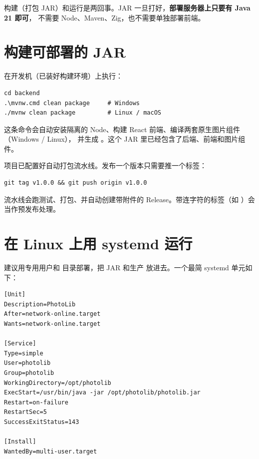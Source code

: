\documentclass[cn,11pt,green]{elegantbook}
\begin{document}
\begin{notebox}[部署机不需要构建工具]
  构建（打包 JAR）和运行是两回事。JAR 一旦打好，\textbf{部署服务器上只要有 Java 21 即可}，
  不需要 Node、Maven、Zig，也不需要单独部署前端。
\end{notebox}

\section{构建可部署的 JAR}

在开发机（已装好构建环境）上执行：

\begin{stepbox}
\begin{verbatim}
cd backend
.\mvnw.cmd clean package     # Windows
./mvnw clean package         # Linux / macOS
\end{verbatim}
\end{stepbox}

这条命令会自动安装隔离的 Node、构建 React 前端、编译两套原生图片组件（Windows / Linux），
并生成 。这个 JAR 里已经包含了后端、前端和图片组件。

\begin{tipbox}
  项目已配置好自动打包流水线。发布一个版本只需要推一个标签：

  \begin{verbatim}git tag v1.0.0 && git push origin v1.0.0\end{verbatim}

  流水线会跑测试、打包、并自动创建带附件的 Release。带连字符的标签（如 ）会当作预发布处理。
\end{tipbox}

\section{在 Linux 上用 systemd 运行}

建议用专用用户和  目录部署，把 JAR 和生产  放进去。一个最简 systemd 单元如下：

\begin{verbatim}
[Unit]
Description=PhotoLib
After=network-online.target
Wants=network-online.target

[Service]
Type=simple
User=photolib
Group=photolib
WorkingDirectory=/opt/photolib
ExecStart=/usr/bin/java -jar /opt/photolib/photolib.jar
Restart=on-failure
RestartSec=5
SuccessExitStatus=143

[Install]
WantedBy=multi-user.target
\end{verbatim}
\end{document}

